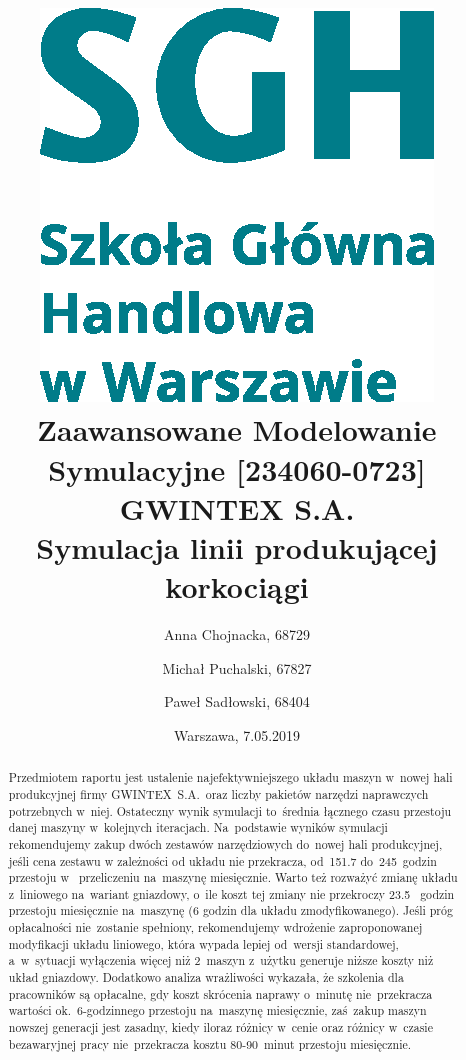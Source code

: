 \documentclass[12pt, a4paper, oneside]{mwart} %
\begin{document}
\title{\includegraphics[width = 0.3 \textwidth]{wykresy/SGHlogotypCMYKpl.eps}\\
\bigskip
Zaawansowane Modelowanie Symulacyjne [234060-0723]\\ 
\bigskip
GWINTEX S.A.\\
Symulacja linii produkującej korkociągi}
\author{Anna Chojnacka, 68729 \and
Michał Puchalski, 67827 \and
Paweł Sadłowski, 68404 }
\date{Warszawa, 7.05.2019}
\maketitle

\pagebreak
\raggedbottom
\begin{center}
\begin{abstract}
Przedmiotem raportu jest ustalenie najefektywniejszego układu maszyn w~nowej hali produkcyjnej firmy GWINTEX~S.A.~oraz liczby pakietów narzędzi naprawczych potrzebnych w~niej. Ostateczny wynik symulacji to~średnia łącznego czasu przestoju danej maszyny w~kolejnych iteracjach. Na~podstawie wyników symulacji rekomendujemy zakup dwóch zestawów narzędziowych do~nowej hali produkcyjnej, jeśli cena zestawu w zależności od układu nie przekracza, od~151.7 do~245~godzin przestoju w~ przeliczeniu na~maszynę miesięcznie. Warto też rozważyć zmianę układu z~liniowego na~wariant gniazdowy, o~ile koszt tej zmiany nie przekroczy 23.5 ~godzin przestoju miesięcznie na~maszynę (6 godzin dla układu zmodyfikowanego). Jeśli próg opłacalności nie~zostanie spełniony, rekomendujemy wdrożenie zaproponowanej modyfikacji układu liniowego, która wypada lepiej od~wersji standardowej, a~w~sytuacji wyłączenia więcej niż 2~maszyn z~użytku generuje niższe koszty niż układ gniazdowy. Dodatkowo analiza wrażliwości wykazała, że szkolenia dla pracowników są opłacalne, gdy koszt skrócenia naprawy o~minutę nie~przekracza wartości ok.~6-godzinnego przestoju na~maszynę miesięcznie, zaś~zakup maszyn nowszej generacji jest zasadny, kiedy iloraz różnicy w~cenie oraz różnicy w~czasie bezawaryjnej pracy nie~przekracza kosztu 80-90~minut przestoju miesięcznie.
\end{abstract}
\end{center}
\pagebreak
\end{document}
